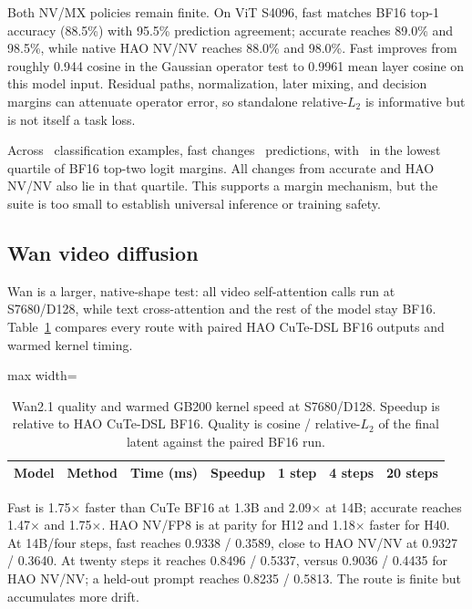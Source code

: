Both NV/MX policies remain finite. On ViT S4096, fast matches BF16 top-1
accuracy (88.5\%) with 95.5\% prediction agreement; accurate reaches 89.0\%
and 98.5\%, while native HAO NV/NV reaches 88.0\% and 98.0\%. Fast improves
from roughly 0.944 cosine in the Gaussian operator test to 0.9961 mean layer
cosine on this model input. Residual paths, normalization, later mixing, and
decision margins can attenuate operator error, so standalone relative-$L_2$
is informative but is not itself a task loss.

Across \DownstreamClassificationSamples\ classification examples, fast
changes \DownstreamFastPredictionChanges\ predictions, with
\DownstreamFastLowMarginChanges\ in the lowest quartile of BF16 top-two logit
margins. All changes from accurate and HAO NV/NV also lie in that quartile.
This supports a margin mechanism, but the suite is too small to establish
universal inference or training safety.

\subsection{Wan video diffusion}

Wan is a larger, native-shape test: all video self-attention calls run at
S7680/D128, while text cross-attention and the rest of the model stay BF16.
Table~\ref{tab:wan-downstream} compares every route with paired HAO CuTe-DSL
BF16 outputs and warmed kernel timing.

\begin{table}[htbp]
\centering
\caption{Wan2.1 quality and warmed GB200 kernel speed at S7680/D128. Speedup
is relative to HAO CuTe-DSL BF16. Quality is cosine / relative-$L_2$ of the
final latent against the paired BF16 run.}
\label{tab:wan-downstream}
\scriptsize
\begin{adjustbox}{max width=\textwidth}
\begin{tabular}{llrrccc}
\toprule
Model & Method & Time (ms) & Speedup & 1 step & 4 steps & 20 steps \\
\midrule
%
\end{tabular}
\end{adjustbox}
\end{table}

Fast is 1.75$\times$ faster than CuTe BF16 at 1.3B and 2.09$\times$ at 14B;
accurate reaches 1.47$\times$ and 1.75$\times$. HAO NV/FP8 is at parity for
H12 and 1.18$\times$ faster for H40. At 14B/four steps, fast reaches
0.9338 / 0.3589, close to HAO NV/NV at 0.9327 / 0.3640. At twenty steps it
reaches 0.8496 / 0.5337, versus 0.9036 / 0.4435 for HAO NV/NV; a held-out
prompt reaches 0.8235 / 0.5813. The route is finite but accumulates more drift.

